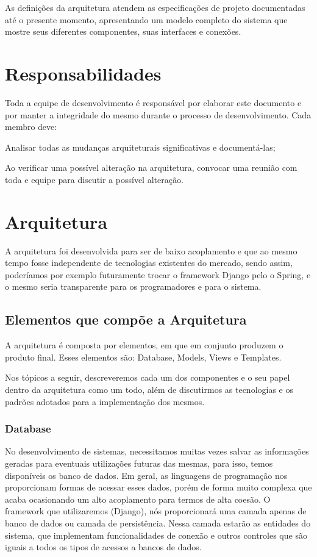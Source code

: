 As definições da arquitetura atendem as especificações de projeto documentadas 
até o presente momento, apresentando um modelo completo do sistema que mostre 
seus diferentes componentes, suas interfaces e conexões.

\section{Responsabilidades}
Toda a equipe de desenvolvimento é responsável por elaborar este documento  e 
por manter a integridade do mesmo durante o processo de desenvolvimento. Cada 
membro deve:
\begin{alineascomponto}
	\item Analisar todas as mudanças arquiteturais significativas e 
documentá-las;
    \item Ao verificar uma possível alteração na arquitetura, convocar uma 
reunião com toda e equipe para discutir a possível alteração. 
\end{alineascomponto}

\section{Arquitetura}
A arquitetura foi desenvolvida para ser de baixo acoplamento e que ao mesmo 
tempo fosse independente de tecnologias existentes do mercado, sendo assim, 
poderíamos por exemplo futuramente trocar o framework Django pelo o Spring, e o 
mesmo seria transparente para os programadores e para o sistema.

\subsection{Elementos que compõe a Arquitetura}
A arquitetura é composta por elementos, em que em conjunto produzem o produto 
final. Esses elementos são: Database, Models, Views e Templates.

Nos tópicos a seguir, descreveremos cada um dos componentes e o seu papel  dentro 
da arquitetura como um todo, além de discutirmos as tecnologias e os padrões 
adotados para a implementação dos mesmos.

\subsubsection{Database}
No desenvolvimento de sistemas, necessitamos muitas vezes salvar as informações 
geradas para eventuais utilizações futuras das mesmas, para isso, temos disponíveis os 
banco de dados. Em geral, as linguagens de programação nos proporcionam formas 
de acessar esses dados, porém de forma muito  complexa que acaba ocasionando um 
alto acoplamento para termos de alta coesão. O framework que utilizaremos (Django), nós 
proporcionar\'a uma camada apenas de banco de dados ou camada de persistência. Nessa camada estar\~ao as entidades do sistema, que implementam funcionalidades de conexão e outros controles que são 
iguais a todos os tipos de acessos a bancos de dados. 

